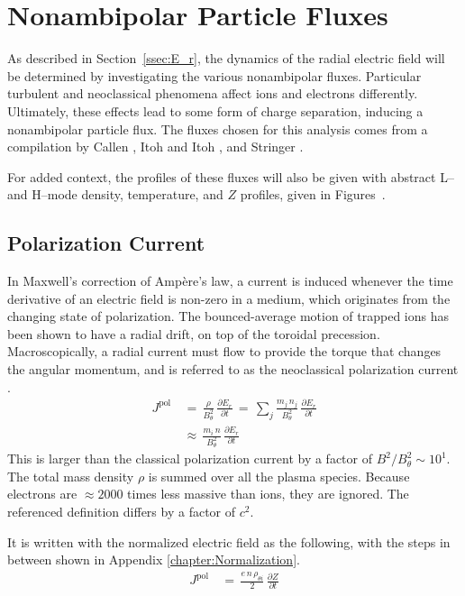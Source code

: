 \section{Nonambipolar Particle Fluxes}\label{sec:nonambipolar_fluxes}
As described in Section~\ref{ssec:E_r}, the dynamics of the radial electric field will be determined by investigating the various nonambipolar fluxes.
Particular turbulent and neoclassical phenomena affect ions and electrons differently.
Ultimately, these effects lead to some form of charge separation, inducing a nonambipolar particle flux.
The fluxes chosen for this analysis comes from a compilation by Callen \cite{callen_toroidal_2009}, Itoh and Itoh \cite{itoh_role_1996}, and Stringer \cite{stringer_explanation_1993}.

For added context, the profiles of these fluxes will also be given with abstract L-- and H--mode density, temperature, and $Z$ profiles, given in Figures~.

\subsection{Polarization Current}\label{ssec:polarization_current}
In Maxwell's correction of Amp\`ere's law, a current is induced whenever the time derivative of an electric field is non-zero in a medium, which originates from the changing state of polarization.
The bounced-average motion of trapped ions has been shown to have a radial drift, on top of the toroidal precession.
Macroscopically, a radial current must flow to provide the torque that changes the angular momentum, and is referred to as the neoclassical polarization current \cite{hinton_neoclassical_1984}.
\begin{align} %
	J^\text{pol} \,&=\, \frac{\rho}{B_\theta^2} \,
		\frac{\partial E_r}{\partial t} \,=\, \sum_j \frac{m_j \, n_j }
		{B_\theta^2} \, \frac{\partial E_r}{\partial t} \\
	\,&\approx\, \frac{m_i \, n}{B_\theta^2} \, \frac{\partial E_r}{\partial t}
		\label{eq:polarization_current_original}
\end{align}
This is larger than the classical polarization current by a factor of $B^2 / B_\theta^2 \sim 10^1$.
The total mass density $\rho$ is summed over all the plasma species.
Because electrons are $\approx 2000$ times less massive than ions, they are ignored.
The referenced definition differs by a factor of $c^2$.

It is written with the normalized electric field as the following, with the steps in between shown in Appendix \ref{chapter:Normalization}.
\begin{align} %
	J^\text{pol} \,&=\, \frac{e \, n \, \rho_{\theta i}}{2} \,
		\frac{\partial Z}{\partial t} \label{eq:polarization_current_normalized}
\end{align}


